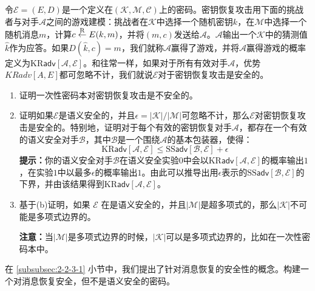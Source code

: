 \begin{exercise}[密钥恢复攻击]
令$\mathcal{E}=(E,D)$是一个定义在$(\mathcal{K},\mathcal{M},\mathcal{C})$上的密码。密钥恢复攻击用下面的挑战者与对手$\mathcal{A}$之间的游戏建模：挑战者在$\mathcal{K}$中选择一个随机密钥$k$，在$\mathcal{M}$中选择一个随机消息$m$，计算$c\overset{\rm R}\leftarrow E(k,m)$，并将$(m,c)$发送给$\mathcal{A}$。$\mathcal{A}$输出一个$\mathcal{K}$中的猜测值$\hat k$作为应答。如果$D(\hat{k},c)=m$，我们就称$\mathcal{A}$赢得了游戏，并将$\mathcal{A}$赢得游戏的概率定义为$\mathrm{KR}\mathsf{adv}[\mathcal{A},\mathcal{E}]$。和往常一样，如果对于所有有效对手$\mathcal{A}$，优势$KRadv[A,E]$都可忽略不计，我们就说$\mathcal{E}$对于密钥恢复攻击是安全的。
\begin{enumerate}[\indent(a)]
	\item 证明一次性密码本对密钥恢复攻击是不安全的。
	\item 证明如果$\mathcal{E}$是语义安全的，并且$\epsilon=|\mathcal{K}|/|\mathcal{M}|$可忽略不计，那么$\mathcal{E}$对密钥恢复攻击是安全的。特别地，证明对于每个有效的密钥恢复对手$\mathcal{A}$，都存在一个有效的语义安全对手$\mathcal{B}$，其中$\mathcal{B}$是一个围绕$\mathcal{A}$的基本包装器，使得：
	$$\mathrm{KR}\mathsf{adv}[\mathcal{A},\mathcal{E}]\leq\mathrm{SS}\mathsf{adv}[\mathcal{B},\mathcal{E}]+\epsilon$$
	\textbf{提示：}你的语义安全对手$\mathcal{B}$在语义安全实验$0$中会以$\mathrm{KR}\mathsf{adv}[\mathcal{A},\mathcal{E}]$的概率输出$1$，在实验$1$中以最多$\epsilon$的概率输出$1$。由此可以推导出用$\epsilon$表示的$\mathrm{SS}\mathsf{adv}[\mathcal{B},\mathcal{E}]$的下界，并由该结果得到$\mathrm{KR}\mathsf{adv}[\mathcal{A},\mathcal{E}]$。
	\item 基于(b)证明，如果 $\mathcal{E}$ 在是语义安全的，并且$|\mathcal{M}|$是超多项式的，那么$|\mathcal{K}|$不可能是多项式边界的。

	\vspace{1pt}

	\textbf{注意：}当$|\mathcal{M}|$是多项式边界的时候，$|\mathcal{K}|$可以是多项式边界的，比如在一次性密码本中。
\end{enumerate}
\end{exercise}

\begin{exercise}[对消息恢复的安全性]
在 \ref{subsubsec:2-2-3-1} 小节中，我们提出了针对消息恢复的安全性的概念。构建一个对消息恢复安全，但不是语义安全的密码。
\end{exercise}

